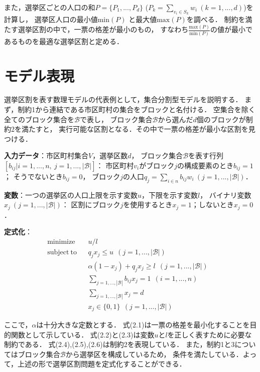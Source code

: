 また，選挙区ごとの人口の和$P=\{P_1,...,P_d\}$ ($P_k=\sum_{v_i\in S_k}w_i\ (k=1,...,d)$)を計算し，
選挙区人口の最小値$\mathrm{min}(P)$ と最大値$\mathrm{max}(P)$を調べる．
制約を満たす選挙区割の中で，一票の格差が最小のもの，
すなわち$\frac{\mathrm{max}(P)}{\mathrm{min}(P)}$の値が最小であるものを最適な選挙区割と定める．


\section{モデル表現}
選挙区割を表す数理モデルの代表例として，集合分割型モデル\cite{nemoto}を説明する．
まず，制約1から連結である市区町村の集合をブロックと名付ける．
空集合を除く全てのブロック集合を$\mathscr{B}$で表し，
ブロック集合$\mathscr{B}$から選んだ$d$個のブロックが制約2を満たすと，
実行可能な区割となる．その中で一票の格差が最小な区割を見つける．

\textbf{入力データ}：市区町村集合$V$，選挙区数$d$，
ブロック集合$\mathscr{B}$を表す行列$[b_{ij}|i=1,...,n,~j=1,...,|\mathscr{B}|]$：
市区町村$v_i$がブロック$j$の構成要素のとき$b_{ij}=1$；
そうでないとき$b_{ij}=0$，
ブロック$j$の人口$q_j=\sum_{i\in n}b_{ij}w_{i}~(j=1,...,|\mathscr{B}|)$．

\textbf{変数}：一つの選挙区の人口上限を示す変数$u$，下限を示す変数$l$，
バイナリ変数$x_j~(j=1,...,|\mathscr{B}|)$：
区割にブロック$j$を使用するとき$x_j=1$；しないとき$x_j=0$．

\textbf{定式化}：
\begin{align}
    &\mathrm{minimize} && u/l && \\
    &\mathrm{subject~to} && q_jx_j\leq u~~(j=1,...,|\mathscr{B}|) && \\
    & && \alpha(1-x_j)+q_jx_j\geq l~~(j=1,...,|\mathscr{B}|) && \\
    & && \sum_{j=1,...,|\mathscr{B}|}b_{ij}x_{j}=1~~(i = 1, ... , n) && \\
    & && \sum_{j=1,...,|\mathscr{B}|}x_j=d && \\
    & && x_j \in \{0,1\}~~(j=1,...,|\mathscr{B}|) &&
\end{align}

ここで，$\alpha$は十分大きな定数とする．
式(2.1)は一票の格差を最小化することを目的関数として示している．
式(2.2)と(2.3)は変数$u$と$l$を正しく表すために必要な制約である．
式(2.4),(2.5),(2.6)は制約2を表現している．
また，制約1と3についてはブロック集合$\mathscr{B}$から選挙区を構成しているため，
条件を満たしている．よって，上述の形で選挙区割問題を定式化することができる．